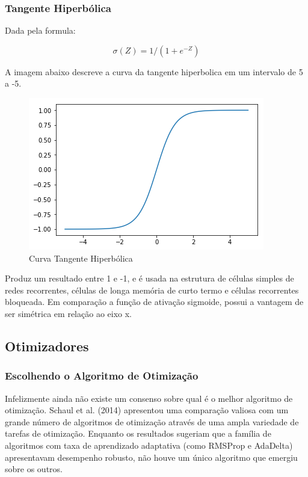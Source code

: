 \documentclass[12pt]{article}
\begin{document}
\subsubsection{Tangente Hiperbólica}

Dada pela formula: 

\begin{equation}
    \sigma(Z) = 1/(1+e^{-Z})
\end{equation}

A imagem abaixo descreve a curva da tangente hiperbolica em um intervalo de 5 a -5.

\begin{figure}[ht]
\centering
\includegraphics[width=.5\textwidth]{images/tanh.png}
\caption{Curva Tangente Hiperbólica}
\label{fig:tanh}
\end{figure}

Produz um resultado entre 1 e -1, e é usada na estrutura de células simples de redes recorrentes, células de longa memória de curto termo e células recorrentes bloqueada. Em comparação a função de ativação sigmoide, possui a vantagem de ser simétrica em relação ao eixo x.

\subsection{Otimizadores}

\subsubsection{Escolhendo o Algoritmo de Otimização}

Infelizmente ainda não existe um consenso sobre qual é o melhor algoritmo de otimização. Schaul et al. (2014) apresentou uma comparação valiosa com um grande número de algoritmos de otimização através de uma ampla variedade de tarefas de otimização. Enquanto os resultados sugeriam que a família de algoritmos com taxa de aprendizado adaptativa (como RMSProp e AdaDelta) apresentavam desempenho robusto, não houve um único algoritmo que emergiu sobre os outros.
\end{document}
